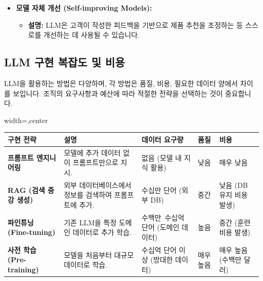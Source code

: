 \documentclass[11pt,a4paper]{article}
\begin{document}
\begin{itemize}
    \item \textbf{모델 자체 개선 (Self-improving Models):}
    \begin{itemize}
        \item \textbf{설명:} LLM은 고객이 작성한 피드백을 기반으로 제품 추천을 조정하는 등 스스로를 개선하는 데 사용될 수 있습니다.
    \end{itemize}
\end{itemize}

\subsection{LLM 구현 복잡도 및 비용}

LLM을 활용하는 방법은 다양하며, 각 방법은 품질, 비용, 필요한 데이터 양에서 차이를 보입니다. 조직의 요구사항과 예산에 따라 적절한 전략을 선택하는 것이 중요합니다.

\begin{adjustbox}{width=\textwidth,center}
\begin{tabular}{lllll}
\toprule
\textbf{구현 전략} & \textbf{설명} & \textbf{데이터 요구량} & \textbf{품질} & \textbf{비용} \\
\midrule
\textbf{프롬프트 엔지니어링} & 모델에 추가 데이터 없이 프롬프트만으로 지시. & 없음 (모델 내 지식 활용) & 낮음 & 매우 낮음 \\
\textbf{RAG (검색 증강 생성)} & 외부 데이터베이스에서 정보를 검색하여 프롬프트에 추가. & 수십만 단어 (외부 DB) & 중간 & 낮음 (DB 유지 비용 발생) \\
\textbf{파인튜닝 (Fine-tuning)} & 기존 LLM을 특정 도메인 데이터로 추가 학습. & 수백만~수십억 단어 (도메인 데이터) & 높음 & 중간 (훈련 비용 발생) \\
\textbf{사전 학습 (Pre-training)} & 모델을 처음부터 대규모 데이터로 학습. & 수십억 단어 이상 (방대한 데이터) & 매우 높음 & 매우 높음 (수백만 달러) \\
\bottomrule
\end{tabular}
\end{adjustbox}
\end{document}
